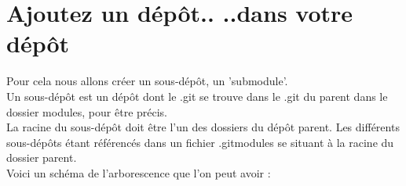 \newpage
\section{Ajoutez un dépôt.. ..dans votre dépôt}

%

Pour cela nous allons créer un sous-dépôt, un 'submodule'.\\
Un sous-dépôt est un dépôt dont le .git se trouve dans le .git du parent dans le dossier modules, pour être précis.\\
La racine du sous-dépôt doit être l'un des dossiers du dépôt parent. Les différents sous-dépôts étant référencés dans un fichier .gitmodules se situant à la racine du dossier parent.\\

Voici un schéma de l'arborescence que l'on peut avoir :\\


